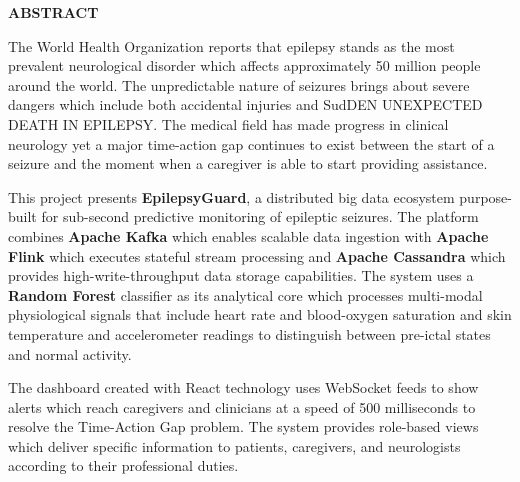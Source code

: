 \documentclass[12pt, a4paper, oneside]{report}
\renewcommand{\headrulewidth}{0.4pt}
\renewcommand{\footrulewidth}{0.4pt}
\begin{document}
\pagestyle{empty}
\renewcommand{\headrulewidth}{0pt}
\renewcommand{\footrulewidth}{0pt}

\thispagestyle{empty}
\begin{center}
    {\Large \textbf{ABSTRACT} \par}
    \vspace{1.5cm}
\end{center}

\noindent The World Health Organization reports that epilepsy stands as the most prevalent neurological disorder which affects approximately 50 million people around the world. The unpredictable nature of seizures brings about severe dangers which include both accidental injuries and SudDEN UNEXPECTED DEATH IN EPILEPSY. The medical field has made progress in clinical neurology yet a major time-action gap continues to exist between the start of a seizure and the moment when a caregiver is able to start providing assistance.

\vspace{0.5cm}
\noindent This project presents \textbf{EpilepsyGuard}, a distributed big data ecosystem purpose-built for sub-second predictive monitoring of epileptic seizures. The platform combines \textbf{Apache Kafka} which enables scalable data ingestion with \textbf{Apache Flink} which executes stateful stream processing and \textbf{Apache Cassandra} which provides high-write-throughput data storage capabilities. The system uses a \textbf{Random Forest} classifier as its analytical core which processes multi-modal physiological signals that include heart rate and blood-oxygen saturation and skin temperature and accelerometer readings to distinguish between pre-ictal states and normal activity.

\vspace{0.5cm}
\noindent The dashboard created with React technology uses WebSocket feeds to show alerts which reach caregivers and clinicians at a speed of 500 milliseconds to resolve the Time-Action Gap problem. The system provides role-based views which deliver specific information to patients, caregivers, and neurologists according to their professional duties.
\clearpage
\tableofcontents
\end{document}

